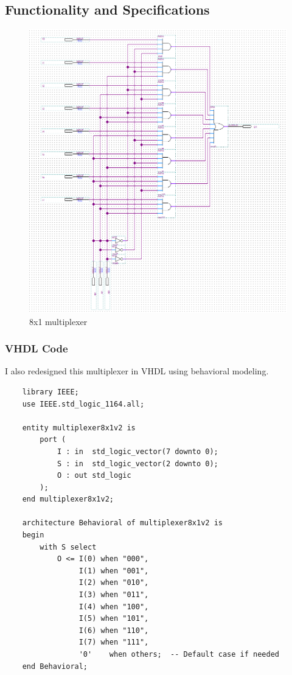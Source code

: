 \documentclass[12pt]{article}
\begin{document}
\subsection{Functionality and Specifications}
\begin{figure}[h]
\caption{8x1 multiplexer}
\centering
\includegraphics[width=\textwidth]{./diagrams/8x1multiplexer.png}
\end{figure}

\clearpage
\subsubsection{VHDL Code}
I also redesigned this multiplexer in VHDL using behavioral modeling.
\begin{verbatim}
    library IEEE;
    use IEEE.std_logic_1164.all;
    
    entity multiplexer8x1v2 is
        port (
            I : in  std_logic_vector(7 downto 0);
            S : in  std_logic_vector(2 downto 0);
            O : out std_logic
        );
    end multiplexer8x1v2;
    
    architecture Behavioral of multiplexer8x1v2 is
    begin
        with S select
            O <= I(0) when "000",
                 I(1) when "001",
                 I(2) when "010",
                 I(3) when "011",
                 I(4) when "100",
                 I(5) when "101",
                 I(6) when "110",
                 I(7) when "111",
                 '0'    when others;  -- Default case if needed
    end Behavioral;
\end{verbatim}
\clearpage
\end{document}
